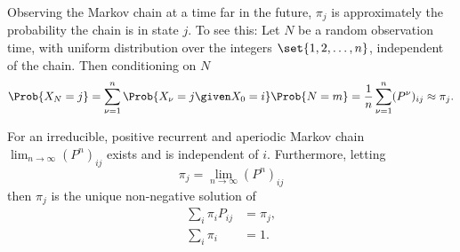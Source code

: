 \documentclass[12pt]{article}
\begin{document}
\begin{remark}
    Observing the Markov chain at a time far in the future, \( \pi_j \)
    is approximately the probability the chain is in state \( j \).  To
    see this:  Let \( N \) be a random observation time, with uniform
    distribution over the integers \( \set{1, 2, \dots, n} \),
    independent of the chain. Then conditioning on \( N \)
    \[
        \Prob{X_N = j} = \sum\limits_{\nu=1}^n \Prob{X_{\nu} = j \given
        X_0 = i} \Prob{N = m} = \frac{1}{n} \sum\limits_{\nu=1}^n (P^{\nu})_
        {ij} \approx \pi_j.
    \]
\end{remark}

\begin{theorem}
    For an irreducible, positive recurrent and aperiodic Markov chain \(
    \lim_{n \to \infty} (P^n)_{ij} \) exists and is independent of \( i \).
    Furthermore, letting
    \[
        \pi_j = \lim_{n \to \infty} (P^n)_{ij}
    \] then \( \pi_j \) is the unique non-negative solution of
    \begin{align}
        \sum\limits_{i} \pi_{i} P_{ij} &= \pi_{j},%
        \label{eq:stationarydistributions:FTMC1}\\
        \sum\limits_{i} \pi_{i} &= 1.%
        \label{eq:stationarydistributions:FTMC2}
    \end{align}
\end{theorem}
\end{document}
